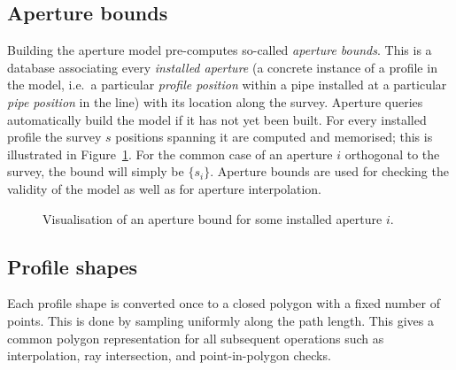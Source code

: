 \subsection{Aperture bounds}

Building the aperture model pre-computes so-called \emph{aperture bounds}.
This is a database associating every \emph{installed aperture} (a concrete instance of a profile in the model, i.e.~a particular \emph{profile position} within a pipe installed at a particular \emph{pipe position} in the line) with its location along the survey.
Aperture queries automatically build the model if it has not yet been built.
For every installed profile the survey $s$ positions spanning it are computed and memorised; this is illustrated in Figure~\ref{fig:aperture-bounds}.
For the common case of an aperture $i$ orthogonal to the survey, the bound will simply be $\{s_i\}$.
Aperture bounds are used for checking the validity of the model as well as for aperture interpolation.

\begin{figure}
	\centering
	\caption{Visualisation of an aperture bound for some installed aperture $i$.}\label{fig:aperture-bounds}
\end{figure}

\subsection{Profile shapes}

Each profile shape is converted once to a closed polygon with a fixed number of points.
This is done by sampling uniformly along the path length.
This gives a common polygon representation for all subsequent operations such as interpolation, ray intersection, and point-in-polygon checks.

